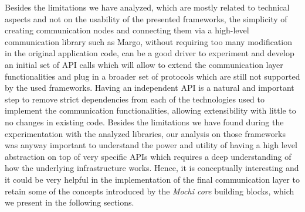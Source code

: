 \documentclass[12pt, oneside]{report}
\begin{document}
Besides the limitations we have analyzed, which are mostly related to technical aspects and not on the usability of the presented frameworks, the simplicity of creating communication nodes and connecting them via a high-level communication library such as Margo, without requiring too many modification in the original application code, can be a good driver to experiment and develop an initial set of API calls which will allow to extend the communication layer functionalities and plug in a broader set of protocols which are still not supported by the used frameworks. Having an independent API is a natural and important step to remove strict dependencies from each of the technologies used to implement the communication functionalities, allowing extensibility with little to no changes in existing code.
Besides the limitations we have found during the experimentation with the analyzed libraries, our analysis on those frameworks was anyway important to understand the power and utility of having a high level abstraction on top of very specific APIs which requires a deep understanding of how the underlying infrastructure works. Hence, it is conceptually interesting and it could be very helpful in the implementation of the final communication layer to retain some of the concepts introduced by the \textit{Mochi core} building blocks, which we present in the following sections.\newline
\end{document}
